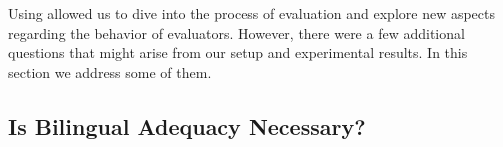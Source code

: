  Using \eye allowed us to dive into the process of evaluation and explore new aspects regarding the behavior of evaluators. However, there were a few additional questions that might arise from our setup and experimental results. In this section we address some of them. %
\subsection{Is Bilingual Adequacy Necessary?}

